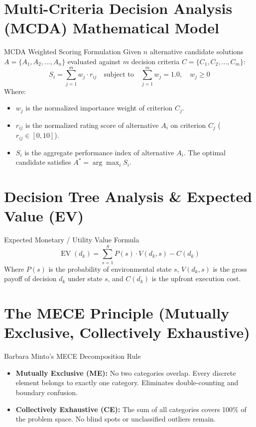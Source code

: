 \section{Multi-Criteria Decision Analysis (MCDA) Mathematical Model}

\begin{metricbox}{MCDA Weighted Scoring Formulation}
Given $n$ alternative candidate solutions $A = \{A_1, A_2, \dots, A_n\}$ evaluated against $m$ decision criteria $C = \{C_1, C_2, \dots, C_m\}$:
\[
S_i = \sum_{j=1}^m w_j \cdot r_{ij} \quad \text{subject to} \quad \sum_{j=1}^m w_j = 1.0, \quad w_j \ge 0
\]
Where:
\begin{itemize}
    \item $w_j$ is the normalized importance weight of criterion $C_j$.
    \item $r_{ij}$ is the normalized rating score of alternative $A_i$ on criterion $C_j$ ($r_{ij} \in [0, 10]$).
    \item $S_i$ is the aggregate performance index of alternative $A_i$. The optimal candidate satisfies $A^* = \arg\max_{i} S_i$.
\end{itemize}
\end{metricbox}

\section{Decision Tree Analysis \& Expected Value (EV)}

\begin{metricbox}{Expected Monetary / Utility Value Formula}
\[
\operatorname{EV}(d_k) = \sum_{s=1}^S P(s) \cdot V(d_k, s) - C(d_k)
\]
Where $P(s)$ is the probability of environmental state $s$, $V(d_k, s)$ is the gross payoff of decision $d_k$ under state $s$, and $C(d_k)$ is the upfront execution cost.
\end{metricbox}

\section{The MECE Principle (Mutually Exclusive, Collectively Exhaustive)}

\begin{frameworkbox}{Barbara Minto's MECE Decomposition Rule}
\begin{itemize}
    \item \textbf{Mutually Exclusive (ME):} No two categories overlap. Every discrete element belongs to exactly one category. Eliminates double-counting and boundary confusion.
    \item \textbf{Collectively Exhaustive (CE):} The sum of all categories covers 100\% of the problem space. No blind spots or unclassified outliers remain.
\end{itemize}
\end{frameworkbox}

